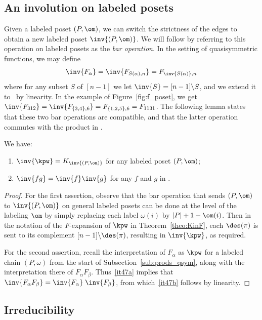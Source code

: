 \subsection{An involution on labeled posets}

Given a labeled poset $(P,\om)$, we can switch the strictness of the edges to obtain a new labeled poset $\inv{(P,\om)}$.  
We will follow \cite{McWa14} by referring to this operation on labeled posets as the \emph{bar operation}.  In the setting of quasisymmetric functions, we may define 
\[
\inv{F_\alpha} = \inv{F_{S(\alpha),n}} = F_{\inv{S(\alpha)},n}
\]
where for any subset $S$ of $[n-1]$ we let $\inv{S}=[n-1]\backslash S$,  and we extend it to \qsym\ by linearity.  In the example of Figure~\ref{fig:f_poset}, we get $\inv{F_{312}} = \inv{F_{\{3,4\},6}} = F_{\{1,2,5\},6}= F_{1131}$.
The following lemma states that these two bar operations are compatible, and that the latter operation commutes with the product in \qsym.
\begin{lemma}\label{lem:bar}
We have:
\begin{enumerate}[label=(\alph*)]
\item \label{it47a} $\inv{\kpw} = K_{\inv{(P,\om)}}$ for any labeled poset $(P,\om)$;
\item \label{it47b} $\inv{fg}=\inv{f}\inv{g}$ for any $f$ and $g$ in \qsym.
\end{enumerate}
\end{lemma}
\begin{proof}
For the first assertion, observe that the bar operation that sends $(P,\om)$ to $\inv{(P,\om)}$ on general labeled posets can be done at the level of the labeling $\om$ by simply replacing each label $\omega(i)$ by $|P|+1-\om(i)$.  Then in the notation of the $F$-expansion of $\kpw$ in Theorem~\ref{theo:KinF}, each $\des(\pi)$ is sent to its complement $[n-1]\backslash\des(\pi)$, resulting in $\inv{\kpw}$, as required.

For the second assertion, recall the interpretation of $F_\alpha$ as $\kpw$ for a labeled chain $(P,\omega)$ from the start of Subsection~\ref{sub:prods_qsym}, along with the interpretation there of $F_\alpha F_\beta$.
Thus~\ref{it47a} implies that $\inv{F_\alpha F_\beta} = \inv{F_\alpha} \; \inv{F_\beta}$, from which~\ref{it47b} follows by linearity.
\end{proof}

\subsection{Irreducibility}

